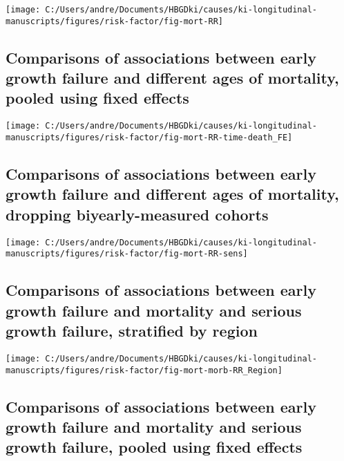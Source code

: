 \documentclass[
  9pt,
]{book}
\begin{document}
\texttt{[image: C:/Users/andre/Documents/HBGDki/causes/ki-longitudinal-manuscripts/figures/risk-factor/fig-mort-RR]}

\hypertarget{comparisons-of-associations-between-early-growth-failure-and-different-ages-of-mortality-pooled-using-fixed-effects}{%
\subsection{Comparisons of associations between early growth failure and different ages of mortality, pooled using fixed effects}\label{comparisons-of-associations-between-early-growth-failure-and-different-ages-of-mortality-pooled-using-fixed-effects}}

\texttt{[image: C:/Users/andre/Documents/HBGDki/causes/ki-longitudinal-manuscripts/figures/risk-factor/fig-mort-RR-time-death\_FE]}

\hypertarget{comparisons-of-associations-between-early-growth-failure-and-different-ages-of-mortality-dropping-biyearly-measured-cohorts}{%
\subsection{Comparisons of associations between early growth failure and different ages of mortality, dropping biyearly-measured cohorts}\label{comparisons-of-associations-between-early-growth-failure-and-different-ages-of-mortality-dropping-biyearly-measured-cohorts}}

\texttt{[image: C:/Users/andre/Documents/HBGDki/causes/ki-longitudinal-manuscripts/figures/risk-factor/fig-mort-RR-sens]}

\hypertarget{comparisons-of-associations-between-early-growth-failure-and-mortality-and-serious-growth-failure-stratified-by-region}{%
\subsection{Comparisons of associations between early growth failure and mortality and serious growth failure, stratified by region}\label{comparisons-of-associations-between-early-growth-failure-and-mortality-and-serious-growth-failure-stratified-by-region}}

\texttt{[image: C:/Users/andre/Documents/HBGDki/causes/ki-longitudinal-manuscripts/figures/risk-factor/fig-mort-morb-RR\_Region]}

\hypertarget{comparisons-of-associations-between-early-growth-failure-and-mortality-and-serious-growth-failure-pooled-using-fixed-effects}{%
\subsection{Comparisons of associations between early growth failure and mortality and serious growth failure, pooled using fixed effects}\label{comparisons-of-associations-between-early-growth-failure-and-mortality-and-serious-growth-failure-pooled-using-fixed-effects}}
\end{document}
